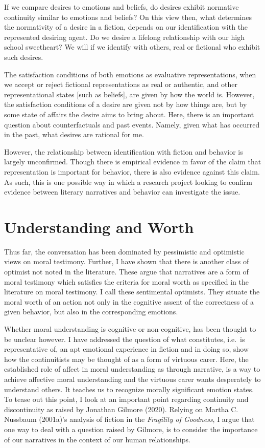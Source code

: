 \documentclass[
  letterpaper,
  DIV=11,
  numbers=noendperiod]{scrartcl}
\theoremstyle{remark}
\begin{document}
If we compare desires to emotions and beliefs, do desires exhibit
normative continuity similar to emotions and beliefs? On this view then,
what determines the normativity of a desire in a fiction, depends on our
identification with the represented desiring agent. Do we desire a
lifelong relationship with our high school sweetheart? We will if we
identify with others, real or fictional who exhibit such desires.

The satisfaction conditions of both emotions as evaluative
representations, when we accept or reject fictional representations as
real or authentic, and other representational states {[}such as
beliefs{]}, are given by how the world is. However, the satisfaction
conditions of a desire are given not by how things are, but by some
state of affairs the desire aims to bring about. Here, there is an
important question about counterfactuals and past events. Namely, given
what has occurred in the past, what desires are rational for me.

However, the relationship between identification with fiction and
behavior is largely unconfirmed. Though there is empirical evidence in
favor of the claim that representation is important for behavior, there
is also evidence against this claim. As such, this is one possible way
in which a research project looking to confirm evidence between literary
narratives and behavior can investigate the issue.

\section{Understanding and Worth}\label{understanding-and-worth}

Thus far, the conversation has been dominated by pessimistic and
optimistic views on moral testimony. Further, I have shown that there is
another class of optimist not noted in the literature. These argue that
narratives are a form of moral testimony which satisfies the criteria
for moral worth as specified in the literature on moral testimony. I
call these sentimental optimists. They situate the moral worth of an
action not only in the cognitive assent of the correctness of a given
behavior, but also in the corresponding emotions.

Whether moral understanding is cognitive or non-cognitive, has been
thought to be unclear however. I have addressed the question of what
constitutes, i.e.~is representative of, an apt emotional experience in
fiction and in doing so, show how the continuitists may be thought of as
a form of virtuous carer. Here, the established role of affect in moral
understanding as through narrative, is a way to achieve affective moral
understanding and the virtuous carer wants desperately to understand
others. It teaches us to recognize morally significant emotion states.
To tease out this point, I look at an important point regarding
continuity and discontinuity as raised by Jonathan Gilmore (2020).
Relying on Martha C. Nussbaum (2001a)'s analysis of fiction in the
\emph{Fragility of Goodness}, I argue that one way to deal with a
question raised by Gilmore, is to consider the importance of our
narratives in the context of our human relationships.
\end{document}
